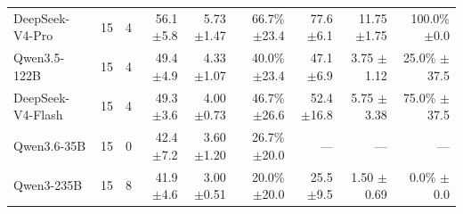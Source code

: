 \begin{table}[t]
\begin{tabular*}{\textwidth}{@{\extracolsep{\fill}}lrrrrrrrr@{}}
DeepSeek-V4-Pro & 15 & 4 & \shortstack[r]{56.1\\{\scriptsize $\pm$5.8}} & \shortstack[r]{5.73\\{\scriptsize $\pm$1.47}} & \shortstack[r]{66.7\%\\{\scriptsize $\pm$23.4}} & \shortstack[r]{77.6\\{\scriptsize $\pm$6.1}} & \shortstack[r]{11.75\\{\scriptsize $\pm$1.75}} & \shortstack[r]{100.0\%\\{\scriptsize $\pm$0.0}} \\
Qwen3.5-122B & 15 & 4 & \shortstack[r]{49.4\\{\scriptsize $\pm$4.9}} & \shortstack[r]{4.33\\{\scriptsize $\pm$1.07}} & \shortstack[r]{40.0\%\\{\scriptsize $\pm$23.4}} & \shortstack[r]{47.1\\{\scriptsize $\pm$6.9}} & \shortstack[r]{3.75\\{\scriptsize $\pm$1.12}} & \shortstack[r]{25.0\%\\{\scriptsize $\pm$37.5}} \\
DeepSeek-V4-Flash & 15 & 4 & \shortstack[r]{49.3\\{\scriptsize $\pm$3.6}} & \shortstack[r]{4.00\\{\scriptsize $\pm$0.73}} & \shortstack[r]{46.7\%\\{\scriptsize $\pm$26.6}} & \shortstack[r]{52.4\\{\scriptsize $\pm$16.8}} & \shortstack[r]{5.75\\{\scriptsize $\pm$3.38}} & \shortstack[r]{75.0\%\\{\scriptsize $\pm$37.5}} \\
Qwen3.6-35B & 15 & 0 & \shortstack[r]{42.4\\{\scriptsize $\pm$7.2}} & \shortstack[r]{3.60\\{\scriptsize $\pm$1.20}} & \shortstack[r]{26.7\%\\{\scriptsize $\pm$20.0}} & --- & --- & --- \\
Qwen3-235B & 15 & 8 & \shortstack[r]{41.9\\{\scriptsize $\pm$4.6}} & \shortstack[r]{3.00\\{\scriptsize $\pm$0.51}} & \shortstack[r]{20.0\%\\{\scriptsize $\pm$20.0}} & \shortstack[r]{25.5\\{\scriptsize $\pm$9.5}} & \shortstack[r]{1.50\\{\scriptsize $\pm$0.69}} & \shortstack[r]{0.0\%\\{\scriptsize $\pm$0.0}} \\

\end{tabular*}
\end{table}
